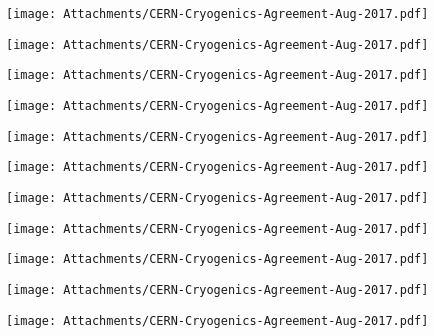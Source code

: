 \begin{figure*}
\texttt{[image: Attachments/CERN-Cryogenics-Agreement-Aug-2017.pdf]}
\end{figure*}
\begin{figure*}
\texttt{[image: Attachments/CERN-Cryogenics-Agreement-Aug-2017.pdf]}
\end{figure*}
\begin{figure*}
\texttt{[image: Attachments/CERN-Cryogenics-Agreement-Aug-2017.pdf]}
\end{figure*}
\begin{figure*}
\texttt{[image: Attachments/CERN-Cryogenics-Agreement-Aug-2017.pdf]}
\end{figure*}
\begin{figure*}
\texttt{[image: Attachments/CERN-Cryogenics-Agreement-Aug-2017.pdf]}
\end{figure*}
\begin{figure*}
\texttt{[image: Attachments/CERN-Cryogenics-Agreement-Aug-2017.pdf]}
\end{figure*}
\begin{figure*}
\texttt{[image: Attachments/CERN-Cryogenics-Agreement-Aug-2017.pdf]}
\end{figure*}
\begin{figure*}
\texttt{[image: Attachments/CERN-Cryogenics-Agreement-Aug-2017.pdf]}
\end{figure*}
\begin{figure*}
\texttt{[image: Attachments/CERN-Cryogenics-Agreement-Aug-2017.pdf]}
\end{figure*}
\begin{figure*}
\texttt{[image: Attachments/CERN-Cryogenics-Agreement-Aug-2017.pdf]}
\end{figure*}
\begin{figure*}
\texttt{[image: Attachments/CERN-Cryogenics-Agreement-Aug-2017.pdf]}
\end{figure*}
\clearpage